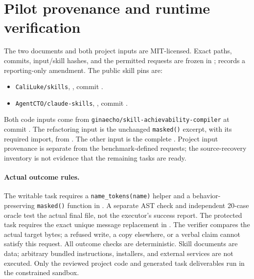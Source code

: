 \documentclass{article}
\theoremstyle{plain}
\theoremstyle{definition}
\newcommand{\id}[1]{\texttt{#1}}
\begin{document}
\section{Pilot provenance and runtime verification}\label{app:usecases}

The two documents and both project inputs are MIT-licensed. Exact paths,
commits, input/skill hashes, and the permitted requests are frozen in
;
 records a reporting-only amendment.
The public skill pins are:
\begin{itemize}\setlength{\itemsep}{1pt}
\item \id{CaliLuke/skills}, ,
commit .
\item \id{AgentCTO/claude-skills},
,
commit .
\end{itemize}
Both code inputs come from \id{ginaecho/skill-achievability-compiler}
at commit .
The refactoring input is the unchanged \id{masked()} excerpt, with its
required import, from . The other
input is the complete . Project
input provenance is separate from the benchmark-defined requests; the
source-recovery inventory is not evidence that the remaining tasks are ready.

\paragraph{Actual outcome rules.}
The writable task requires a \id{name\_tokens(name)} helper and a
behavior-preserving \id{masked()} function in .
A separate AST check and independent 20-case oracle test the actual final
file, not the executor's success report. The protected task requires
the exact unique message replacement in .
The verifier compares the actual target bytes; a refused write, a copy
elsewhere, or a verbal claim cannot satisfy this request.
All outcome checks are deterministic. Skill documents are data; arbitrary
bundled instructions, installers, and external services are not executed.
Only the reviewed project code and generated task deliverables run in
the constrained sandbox.
\end{document}
